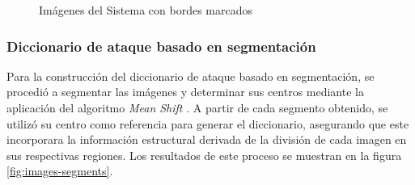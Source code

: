 \begin{figure}[H]
\begin{minipage}[b]{0.3\textwidth}
	\end{minipage}
	\caption{Imágenes del Sistema con bordes marcados}
	\label{fig:images-borders}
\end{figure}


\subsubsection{Diccionario de ataque basado en segmentaci\'on}
Para la construcción del diccionario de ataque basado en segmentación, se procedió a segmentar las imágenes y determinar sus centros mediante la aplicación del algoritmo \textit{Mean Shift} \cite{Comaniciu2002MeanSA}. A partir de cada segmento obtenido, se utilizó su centro como referencia para generar el diccionario, asegurando que este incorporara la información estructural derivada de la división de cada imagen en sus respectivas regiones. Los resultados de este proceso se muestran en la figura \ref{fig:images-segments}.

